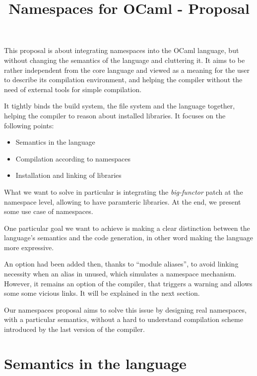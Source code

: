 \documentclass[11pt,a4paper]{article}
\title{Namespaces for OCaml - Proposal}
\begin{document}
\maketitle

This proposal is about integrating namespaces into the OCaml language, but
without changing the semantics of the language and cluttering it. It aims to be
rather independent from the core language and viewed as a meaning for the user to
describe its compilation environment, and helping the compiler without the need
of external tools for simple compilation.

It tightly binds the build system, the file system and the language together,
helping the compiler to reason about installed libraries.
It focuses on the following points:
\begin{itemize}
\item Semantics in the language
\item Compilation according to namespaces
\item Installation and linking of libraries
\end{itemize}

What we want to solve in particular is integrating the \emph{big-functor} patch
at the namespace level, allowing to have paramteric libraries. At the end, we
present some use case of namespaces.

One particular goal we want to achieve is making a clear distinction between the
language's semantics and the code generation, in other word making the language
more expressive. %

An option had been added then, thanks to ``module aliases'', to avoid linking
necessity when an alias in unused, which simulates a namespace
mechanism. However, it remains an option of the compiler, that triggers a
warning and allows some some vicious links. It will be explained in the next
section.

Our namespaces proposal aims to solve this issue by designing real namespaces,
with a particular semantics, without a hard to understand compilation scheme
introduced by the last version of the compiler.




\section{Semantics in the language}
\end{document}
